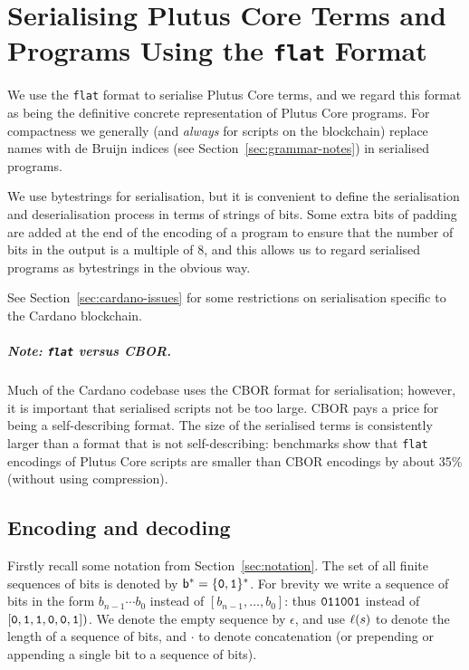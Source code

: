 \chapter{Serialising Plutus Core Terms and Programs Using the \texttt{flat} Format}
\label{appendix:flat-serialisation}
We use the \texttt{flat} format \cite{flat} to serialise Plutus Core
terms, and we regard this format as being the definitive concrete representation
of Plutus Core programs. For compactness we generally (and \textit{always} for
scripts on the blockchain) replace names with de Bruijn indices (see
Section~\ref{sec:grammar-notes}) in serialised programs.

We use bytestrings for serialisation, but it is convenient to define the
serialisation and deserialisation process in terms of strings of bits. Some
extra bits of padding are added at the end of the encoding of a program to
ensure that the number of bits in the output is a multiple of 8, and this allows
us to regard serialised programs as bytestrings in the obvious way.

See Section~\ref{sec:cardano-issues} for some restrictions on serialisation
specific to the Cardano blockchain.

\paragraph{Note: \texttt{flat} versus CBOR.}
Much of the Cardano codebase uses the CBOR format for serialisation; however, it
is important that serialised scripts not be too large. CBOR pays a price for
being a self-describing format. The size of the serialised terms is consistently
larger than a format that is not self-describing: benchmarks show that
\texttt{flat} encodings of Plutus Core scripts are smaller than CBOR encodings
by about 35\% (without using compression).



\section{Encoding and decoding}
Firstly recall some notation from Section~\ref{sec:notation}.  The set of all
finite sequences of bits is denoted by $\mathsf{b}^* = \{\mathtt{0},\mathtt{1}\}^*$.  For
brevity we write a sequence of bits in the form $b_{n-1} \cdots b_0$ instead of
$[b_{n-1}, \ldots, b_0]$: thus $\mathtt{011001}$ instead of $[\mathtt{0},
  \mathtt{1},\mathtt{1},\mathtt{0},\mathtt{0},\mathtt{1}])$.  We denote the empty sequence
by $\epsilon$, and use $\operatorname{\ell}(s)$ to denote the length of a sequence of bits,
and $\cdot$ to denote concatenation (or prepending or appending a single bit to
a sequence of bits).%

